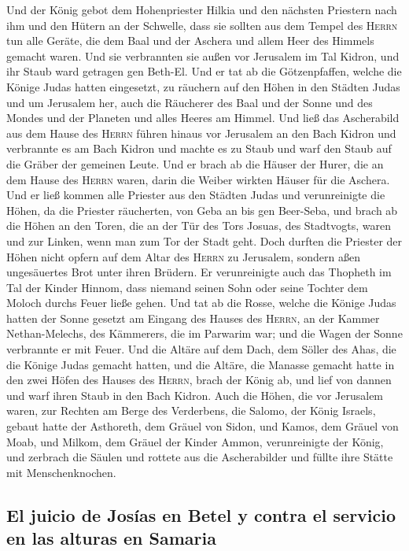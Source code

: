  Und der König gebot dem Hohenpriester Hilkia und den
nächsten Priestern nach ihm und den Hütern an der Schwelle, dass sie
sollten aus dem Tempel des \textsc{Herrn} tun alle Geräte, die dem Baal
und der Aschera und allem Heer des Himmels gemacht waren. Und sie
verbrannten sie außen vor Jerusalem im Tal Kidron, und ihr Staub ward
getragen gen Beth-El.  Und er tat ab die Götzenpfaffen,
welche die Könige Judas hatten eingesetzt, zu räuchern auf den Höhen in
den Städten Judas und um Jerusalem her, auch die Räucherer des Baal und
der Sonne und des Mondes und der Planeten und alles Heeres am Himmel.
 Und ließ das Ascherabild aus dem Hause des \textsc{Herrn}
führen hinaus vor Jerusalem an den Bach Kidron und verbrannte es am Bach
Kidron und machte es zu Staub und warf den Staub auf die Gräber der
gemeinen Leute.  Und er brach ab die Häuser der Hurer, die
an dem Hause des \textsc{Herrn} waren, darin die Weiber wirkten Häuser
für die Aschera.  Und er ließ kommen alle Priester aus den
Städten Judas und verunreinigte die Höhen, da die Priester räucherten,
von Geba an bis gen Beer-Seba, und brach ab die Höhen an den Toren, die
an der Tür des Tors Josuas, des Stadtvogts, waren und zur Linken, wenn
man zum Tor der Stadt geht.  Doch durften die Priester der
Höhen nicht opfern auf dem Altar des \textsc{Herrn} zu Jerusalem,
sondern aßen ungesäuertes Brot unter ihren Brüdern.  Er
verunreinigte auch das Thopheth im Tal der Kinder Hinnom, dass niemand
seinen Sohn oder seine Tochter dem Moloch durchs Feuer ließe gehen.
 Und tat ab die Rosse, welche die Könige Judas hatten der
Sonne gesetzt am Eingang des Hauses des \textsc{Herrn}, an der Kammer
Nethan-Melechs, des Kämmerers, die im Parwarim war; und die Wagen der
Sonne verbrannte er mit Feuer.  Und die Altäre auf dem
Dach, dem Söller des Ahas, die die Könige Judas gemacht hatten, und die
Altäre, die Manasse gemacht hatte in den zwei Höfen des Hauses des
\textsc{Herrn}, brach der König ab, und lief von dannen und warf ihren
Staub in den Bach Kidron.  Auch die Höhen, die vor
Jerusalem waren, zur Rechten am Berge des Verderbens, die Salomo, der
König Israels, gebaut hatte der Asthoreth, dem Gräuel von Sidon, und
Kamos, dem Gräuel von Moab, und Milkom, dem Gräuel der Kinder Ammon,
verunreinigte der König,  und zerbrach die Säulen und
rottete aus die Ascherabilder und füllte ihre Stätte mit
Menschenknochen.

\hypertarget{el-juicio-de-josuxedas-en-betel-y-contra-el-servicio-en-las-alturas-en-samaria}{%
\subsection{El juicio de Josías en Betel y contra el servicio en las
alturas en
Samaria}\label{el-juicio-de-josuxedas-en-betel-y-contra-el-servicio-en-las-alturas-en-samaria}}

